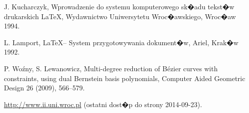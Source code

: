 \documentclass[11pt,wide]{mwart}
\begin{document}
\begin{thebibliography}{9}
\itemsep2pt
 J. Kucharczyk, Wprowadzenie do systemu komputerowego
             sk�adu tekst�w drukarskich \LaTeX, Wydawnictwo Uniwersytetu
             Wroc�awskiego, Wroc�aw 1994.

 L. Lamport, \LaTeX -- System przygotowywania dokument�w,
             Ariel, Krak�w 1992.

  P. Wo\'zny,  S. Lewanowicz,  Multi-degree reduction of B\'ezier curves
		with constraints, using dual Bernstein basis polynomials,
		Computer Aided Geometric Design 26 (2009), 566--579.

 \url{http://www.ii.uni.wroc.pl}   (ostatni dost�p do strony 2014-09-23).

\end{thebibliography}
\end{document}
